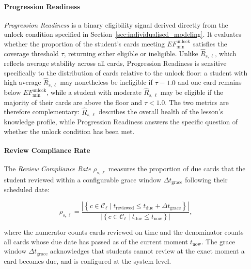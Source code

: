 \paragraph{Progression Readiness}
\textit{Progression Readiness} is a binary eligibility signal derived directly from the unlock condition specified in Section~\ref{sec:individualised_modeling}. It evaluates whether the proportion of the student's cards meeting $EF_{\min}^{\text{unlock}}$ satisfies the coverage threshold $\tau$, returning either eligible or ineligible. Unlike $\hat{R}_{s,\ell}$, which reflects average stability across all cards, Progression Readiness is sensitive specifically to the distribution of cards relative to the unlock floor: a student with high average $\hat{R}_{s,\ell}$ may nonetheless be ineligible if $\tau = 1.0$ and one card remains below $EF_{\min}^{\text{unlock}}$, while a student with moderate $\hat{R}_{s,\ell}$ may be eligible if the majority of their cards are above the floor and $\tau < 1.0$. The two metrics are therefore complementary: $\hat{R}_{s,\ell}$ describes the overall health of the lesson's knowledge profile, while Progression Readiness answers the specific question of whether the unlock condition has been met.

\paragraph{Review Compliance Rate}
The \textit{Review Compliance Rate} $\rho_{s,\ell}$ measures the proportion of due cards that the student reviewed within a configurable grace window $\Delta t_{\text{grace}}$ following their scheduled date:

\begin{equation}
\rho_{s,\ell} = \frac{
    \left|\left\{
        c \in \mathcal{C}_{\ell} \mid 
        t_{\text{reviewed}} \leq 
        t_{\text{due}} + \Delta t_{\text{grace}}
    \right\}\right|
}{
    \left|\left\{
        c \in \mathcal{C}_{\ell} \mid 
        t_{\text{due}} \leq t_{\text{now}}
    \right\}\right|
},
\end{equation}

where the numerator counts cards reviewed on time and the denominator counts all cards whose due date has passed as of the current moment $t_{\text{now}}$. The grace window $\Delta t_{\text{grace}}$ acknowledges that students cannot review at the exact moment a card becomes due, and is configured at the system level.

